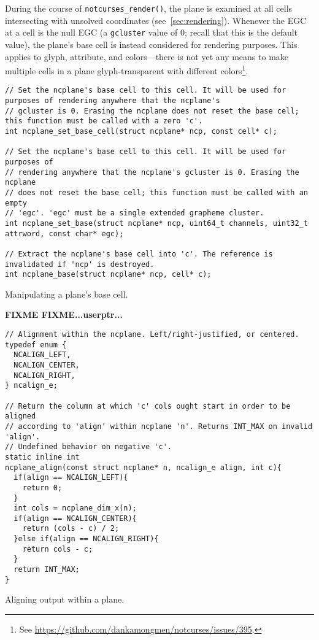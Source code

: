 During the course of \texttt{notcurses\_render()}, the plane is examined at
all cells intersecting with unsolved coordinates (see~\ref{sec:rendering}).
Whenever the EGC at a cell is the null EGC (a \texttt{gcluster} value of 0;
recall that this is the default value), the plane's base cell is instead
considered for rendering purposes. This applies to glyph, attribute, and
colors---there is not yet any means to make multiple cells in a plane glyph-transparent
with different colors\footnote{See \url{https://github.com/dankamongmen/notcurses/issues/395}.}.

\begin{listing}[!htb]
\begin{verbatim}
// Set the ncplane's base cell to this cell. It will be used for purposes of rendering anywhere that the ncplane's
// gcluster is 0. Erasing the ncplane does not reset the base cell; this function must be called with a zero 'c'.
int ncplane_set_base_cell(struct ncplane* ncp, const cell* c);

// Set the ncplane's base cell to this cell. It will be used for purposes of
// rendering anywhere that the ncplane's gcluster is 0. Erasing the ncplane
// does not reset the base cell; this function must be called with an empty
// 'egc'. 'egc' must be a single extended grapheme cluster.
int ncplane_set_base(struct ncplane* ncp, uint64_t channels, uint32_t attrword, const char* egc);

// Extract the ncplane's base cell into 'c'. The reference is invalidated if 'ncp' is destroyed.
int ncplane_base(struct ncplane* ncp, cell* c);
\end{verbatim}
\caption{Manipulating a plane's base cell.}
\end{listing}

\textbf{FIXME FIXME...userptr...}

\begin{listing}[!htb]
\begin{verbatim}
// Alignment within the ncplane. Left/right-justified, or centered.
typedef enum {
  NCALIGN_LEFT,
  NCALIGN_CENTER,
  NCALIGN_RIGHT,
} ncalign_e;

// Return the column at which 'c' cols ought start in order to be aligned
// according to 'align' within ncplane 'n'. Returns INT_MAX on invalid 'align'.
// Undefined behavior on negative 'c'.
static inline int
ncplane_align(const struct ncplane* n, ncalign_e align, int c){
  if(align == NCALIGN_LEFT){
    return 0;
  }
  int cols = ncplane_dim_x(n);
  if(align == NCALIGN_CENTER){
    return (cols - c) / 2;
  }else if(align == NCALIGN_RIGHT){
    return cols - c;
  }
  return INT_MAX;
}
\end{verbatim}
\caption{Aligning output within a plane.}
\end{listing}


